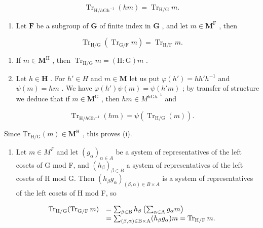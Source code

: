 \[
\operatorname{Tr} _ {\mathrm{H} / h \mathrm{Gh} ^ {- 1}} (h m) = \operatorname{Tr} _ {\mathrm{H} / \mathrm{G}} m.
\]

\begin{enumerate}
\def\labelenumi{(\roman{enumi})}
\setcounter{enumi}{1}
\tightlist
\item
  Let \(\mathbf{F}\) be a subgroup of \(\mathbf{G}\) of finite index in \(\mathbf{G}\) , and let \(m \in \mathbf{M}^{\mathrm{F}}\) , then
\end{enumerate}

\[
\operatorname{Tr} _ {\mathrm{H} / \mathrm{G}} \left(\operatorname{Tr} _ {\mathrm{G} / \mathrm{F}} m\right) = \operatorname{Tr} _ {\mathrm{H} / \mathrm{F}} m.
\]

\begin{enumerate}
\def\labelenumi{(\roman{enumi})}
\setcounter{enumi}{2}
\item
  If \(m \in \mathbf{M}^{\mathrm{H}}\) , then \(\operatorname{Tr}_{\mathrm{H} / \mathrm{G}} m = (\mathrm{H} : \mathrm{G}) m\) .
\item
  Let \(h \in \mathbf{H}\) . For \(h' \in H\) and \(m \in \mathbf{M}\) let us put \(\varphi(h') = hh'h^{-1}\) and \(\psi(m) = hm\) . We have \(\varphi(h') \psi(m) = \psi(h'm)\) ; by transfer of structure we deduce that if \(m \in \mathbf{M}^{\mathrm{G}}\) , then \(hm \in M^{h\mathrm{G}h^{-1}}\) and
\end{enumerate}

\[
\operatorname{Tr} _ {\mathrm{H} / h \mathrm{Gh} ^ {- 1}} (h m) = \psi \left(\operatorname{Tr} _ {\mathrm{H} / \mathrm{G}} (m)\right).
\]

Since \(\mathrm{Tr}_{\mathrm{H} / \mathrm{G}}(m)\in \mathbf{M}^{\mathrm{H}}\) , this proves (i).

\begin{enumerate}
\def\labelenumi{(\roman{enumi})}
\setcounter{enumi}{1}
\tightlist
\item
  Let \(m \in M^{F}\) and let \((g_{\alpha})_{\alpha \in A}\) be a system of representatives of the left cosets of G mod F, and \((h_{\beta})_{\beta \in B}\) a system of representatives of the left cosets of H mod G. Then \((h_{\beta}g_{\alpha})_{(\beta,\alpha) \in B \times A}\) is a system of representatives of the left cosets of H mod F, so
\end{enumerate}

\[
\begin{array}{r l} \operatorname{Tr} _ {\mathrm{H} / \mathrm{G}} (\operatorname{Tr} _ {\mathrm{G} / \mathrm{F}} m) & = \sum_ {\beta \in \mathrm{B}} h _ {\beta} \left(\sum_ {\alpha \in \mathrm{A}} g _ {\alpha} m\right) \\ & = \sum_ {(\beta , \alpha) \in \mathrm{B} \times \mathrm{A}} (h _ {\beta} g _ {\alpha}) m = \operatorname{Tr} _ {\mathrm{H} / \mathrm{F}} m. \end{array}
\]


